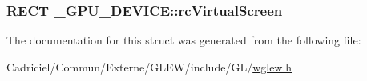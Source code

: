 \hypertarget{struct___g_p_u___d_e_v_i_c_e_aeb573bbeb3b6c589246720ef259b9a27}{
\subsubsection[{rc\-Virtual\-Screen}]{\setlength{\rightskip}{0pt plus 5cm}R\-E\-C\-T \-\_\-\-G\-P\-U\-\_\-\-D\-E\-V\-I\-C\-E\-::rc\-Virtual\-Screen}}\label{struct___g_p_u___d_e_v_i_c_e_aeb573bbeb3b6c589246720ef259b9a27}


The documentation for this struct was generated from the following file\-:\begin{DoxyCompactItemize}
\item 
Cadriciel/\-Commun/\-Externe/\-G\-L\-E\-W/include/\-G\-L/\hyperlink{wglew_8h}{wglew.\-h}\end{DoxyCompactItemize}
